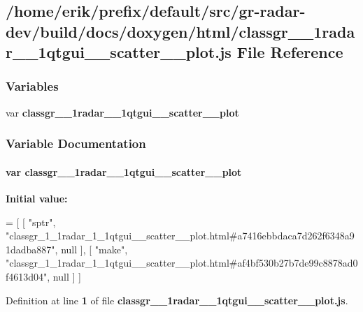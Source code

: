 \subsection{/home/erik/prefix/default/src/gr-\/radar-\/dev/build/docs/doxygen/html/classgr\+\_\+\_\+1radar\+\_\+\_\+1qtgui\+\_\+\+\_\+scatter\+\_\+\+\_\+plot.js File Reference}
\label{classgr__1__1radar__1__1qtgui____scatter____plot_8js}
\subsubsection*{Variables}
\begin{DoxyCompactItemize}
\item 
var {\bf classgr\+\_\+\_\+1radar\+\_\+\_\+1qtgui\+\_\+\+\_\+scatter\+\_\+\+\_\+plot}
\end{DoxyCompactItemize}


\subsubsection{Variable Documentation}
\paragraph[{classgr\+\_\+1\+\_\+1radar\+\_\+1\+\_\+1qtgui\+\_\+\+\_\+scatter\+\_\+\+\_\+plot}]{\setlength{\rightskip}{0pt plus 5cm}var classgr\+\_\+\_\+1radar\+\_\+\_\+1qtgui\+\_\+\+\_\+scatter\+\_\+\+\_\+plot}\label{classgr__1__1radar__1__1qtgui____scatter____plot_8js_a4fa13c5c660d9b32ba22d40d6eed924a}
{\bfseries Initial value\+:}
\begin{DoxyCode}
=
[
    [ \textcolor{stringliteral}{"sptr"}, \textcolor{stringliteral}{"classgr\_1\_1radar\_1\_1qtgui\_\_scatter\_\_plot.html#a7416ebbdaca7d262f6348a91dadba887"}, null ],
    [ \textcolor{stringliteral}{"make"}, \textcolor{stringliteral}{"classgr\_1\_1radar\_1\_1qtgui\_\_scatter\_\_plot.html#af4bf530b27b7de99c8878ad0f4613d04"}, null ]
]
\end{DoxyCode}


Definition at line {\bf 1} of file {\bf classgr\+\_\+\_\+1radar\+\_\+\_\+1qtgui\+\_\+\+\_\+scatter\+\_\+\+\_\+plot.\+js}.

